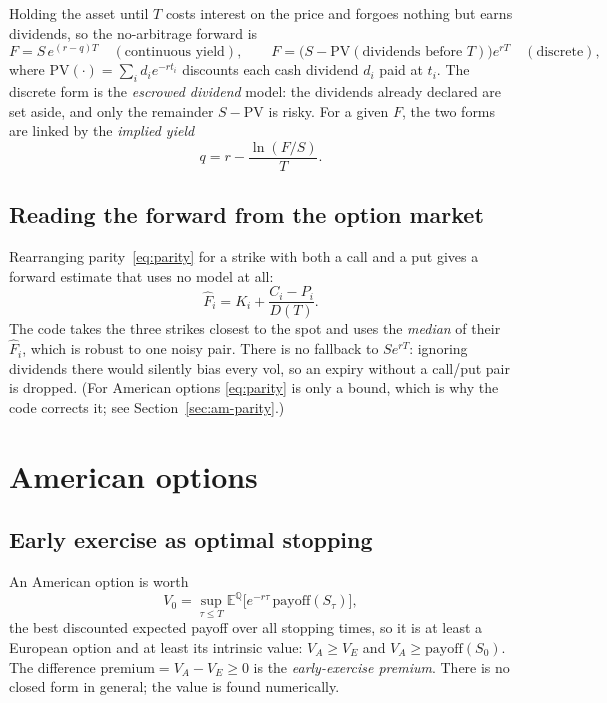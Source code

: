 \documentclass[11pt]{article}
\newcommand{\E}{\mathbb{E}}
\newcommand{\Q}{\mathbb{Q}}
\begin{document}
Holding the asset until $T$ costs interest on the price and forgoes nothing but
earns dividends, so the no-arbitrage forward is
\begin{equation}\label{eq:forward}
  F=S\,e^{(r-q)T}\quad(\text{continuous yield}),\qquad
  F=\bigl(S-\mathrm{PV}(\text{dividends before }T)\bigr)e^{rT}\quad(\text{discrete}),
\end{equation}
where $\mathrm{PV}(\cdot)=\sum_i d_i e^{-r t_i}$ discounts each cash dividend
$d_i$ paid at $t_i$. The discrete form is the \emph{escrowed dividend} model: the
dividends already declared are set aside, and only the remainder $S-\mathrm{PV}$
is risky. For a given $F$, the two forms are linked by the \emph{implied yield}
\begin{equation}
  q=r-\frac{\ln(F/S)}{T}.
\end{equation}

\subsection{Reading the forward from the option market}

Rearranging parity~\eqref{eq:parity} for a strike with both a call and a put gives
a forward estimate that uses no model at all:
\begin{equation}\label{eq:fhat}
  \hat F_i=K_i+\frac{C_i-P_i}{D(T)}.
\end{equation}
The code takes the three strikes closest to the spot and uses the \emph{median}
of their $\hat F_i$, which is robust to one noisy pair. There is no fallback to
$Se^{rT}$: ignoring dividends there would silently bias every vol, so an expiry
without a call/put pair is dropped. (For American options \eqref{eq:parity} is
only a bound, which is why the code corrects it; see
Section~\ref{sec:am-parity}.)

\section{American options}\label{sec:american}

\subsection{Early exercise as optimal stopping}

An American option is worth
\begin{equation}
  V_0=\sup_{\tau\le T}\E^\Q\bigl[e^{-r\tau}\,\mathrm{payoff}(S_\tau)\bigr],
\end{equation}
the best discounted expected payoff over all stopping times, so it is at least a
European option and at least its intrinsic value:
$V_A\ge V_E$ and $V_A\ge\mathrm{payoff}(S_0)$. The difference
$\mathrm{premium}=V_A-V_E\ge0$ is the \emph{early-exercise premium}. There is no
closed form in general; the value is found numerically.
\end{document}

